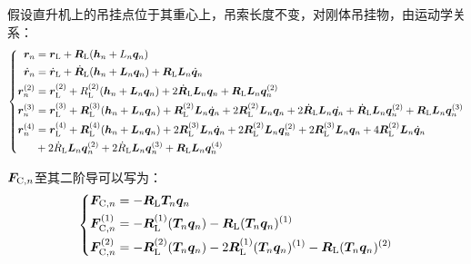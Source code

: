 假设直升机上的吊挂点位于其重心上，吊索长度不变，对刚体吊挂物，由运动学关系：
\begin{equation}\label{r_i}
\left\{\begin{aligned}
        \boldsymbol{r}_n &= \boldsymbol{r}{\rm{_L}} + \boldsymbol{R}{\rm{_L}}(\boldsymbol{h}_n+L_n\boldsymbol{q}_n) \\
        \dot{\boldsymbol{r}}_n &= \dot{\boldsymbol{r}}{\rm{_L}} + \dot{\boldsymbol{R}}{\rm{_L}}(\boldsymbol{h}_n + \boldsymbol{L}_n\boldsymbol{q}_n) + \boldsymbol{R}{\rm{_L}}\boldsymbol{L}_n\dot{\boldsymbol{q}}_n\\
        {\boldsymbol{r}}_n^{(2)} &= {\boldsymbol{r}}{\rm{_L^{(2)}}} + {R}{\rm{_L^{(2)}}}(\boldsymbol{h}_n+\boldsymbol{L}_n\boldsymbol{q}_n)+2\dot{\boldsymbol{R}}{\rm{_L}}\boldsymbol{L}_n\boldsymbol{q}_n+\boldsymbol{R}{\rm{_L}}\boldsymbol{L}_n{\boldsymbol{q}}_n^{(2)}\\
        \boldsymbol{r}_n^{(3)} &= \boldsymbol{r}{\rm{_L^{(3)}}} + \boldsymbol{R}{\rm{_L^{(3)}}}(\boldsymbol{h}_n + \boldsymbol{L}_n\boldsymbol{q}_n) + \boldsymbol{R}{\rm{_L^{(2)}}}\boldsymbol{L}_n\dot{\boldsymbol{q}}_n + 2\boldsymbol{R}{\rm{_L^{(2)}}}\boldsymbol{L}_n\boldsymbol{q}_n + 2\dot{\boldsymbol{R}}{\rm{_L}}\boldsymbol{L}_n\dot{\boldsymbol{q}_n} + \dot{\boldsymbol{R}}{\rm{_L}}\boldsymbol{L}_n\boldsymbol{q}_n^{(2)} + \boldsymbol{R}{\rm{_L}}\boldsymbol{L}_n\boldsymbol{q}_n^{(3)}\\
        \boldsymbol{r}{_n^{(4)}} &= \boldsymbol{r}{\rm{_L^{(4)}}} + \boldsymbol{R}{\rm{_L^{(4)}}}(\boldsymbol{h}_n + \boldsymbol{L}_n\boldsymbol{q}_n) + 2\boldsymbol{R}{\rm{_L^{(3)}}}\boldsymbol{L}_n\dot{\boldsymbol{q}}_n + 2\boldsymbol{R}{\rm{_L^{(2)}}}\boldsymbol{L}_n\boldsymbol{q}{_n^{(2)}} + 2\boldsymbol{R}{\rm{_L^{(3)}}}\boldsymbol{L}_n\boldsymbol{q}_n + 4\boldsymbol{R}{\rm{_L^{(2)}}}\boldsymbol{L}_n\dot{\boldsymbol{q}}_n \\
        &+2\dot{R}{\rm{_L}}\boldsymbol{L}_n\boldsymbol{q}{_n^{(2)}} + 2\dot{R}{\rm{_L}}\boldsymbol{L}_n\boldsymbol{q}{_n^{(3)}} + \boldsymbol{R}{\rm{_L}}\boldsymbol{L}_n\boldsymbol{q}_n^{(4)}
    \end{aligned} \right.
\end{equation}

$\boldsymbol{F}_{{\rm{C}},n}$至其二阶导可以写为：
\begin{equation}\label{Fc_i}
    \left\{
        \begin{aligned}
            \boldsymbol{F}_{{\rm{C}},n} &= -\boldsymbol{R}{\rm{_L}}\boldsymbol{T}_n\boldsymbol{q}_n\\
            \boldsymbol{F}^{(1)}_{{\rm{C}},n} &= -\boldsymbol{R}{\rm{_L^{(1)}}}(\boldsymbol{T}_n\boldsymbol{q}_n) - \boldsymbol{R}{\rm{_L}}(\boldsymbol{T}_n\boldsymbol{q}_n)^{(1)}\\
            \boldsymbol{F}^{(2)}_{{\rm{C}},n} &= -\boldsymbol{R}{\rm{_L^{(2)}}}(\boldsymbol{T}_n\boldsymbol{q}_n) - 2\boldsymbol{R}{\rm{_L^{(1)}}}(\boldsymbol{T}_n\boldsymbol{q}_n)^{(1)} - \boldsymbol{R}{\rm{_L}}(\boldsymbol{T}_n\boldsymbol{q}_n)^{(2)}
        \end{aligned}
    \right.
\end{equation}

